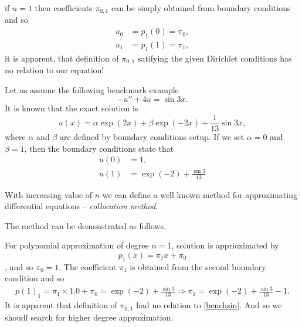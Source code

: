 if $n = 1$ then coefficients $\pi_{0,1}$ can be simply obtained from boundary conditions and so
\begin{equation}
 \begin{split}
  u_{0} &= p_{1}(0) = \pi_{0}, \\
   u_{1} &= p_{1}(1) = \pi_{1},
 \end{split} 
\end{equation}
it is apparent, that definition of $\pi_{0,1}$ satifying the given Dirichlet conditions has no relation to our equation!

Let us assume the following benchmark example
\begin{equation}
\label{benchsin}
 -u'' + 4u  = \sin 3x.
 \end{equation}
It is known that the exact solution is  
\begin{equation}
u(x) = \alpha \exp(2x) + \beta \exp(-2x)+ \frac{1}{13} \sin 3x,  
\end{equation}
where $\alpha$ and $\beta$ are defined by boundary conditions setup. If 
we set $\alpha = 0$ and $\beta = 1$, then the boundary conditions state 
that
\begin{equation}
\begin{split}
  u(0) &= 1, \\
  u(1) &= \exp(-2) + \frac{\sin 3}{13}
\end{split}
\end{equation}

With increasing value of $n$ we can define a well known method for approximating differential equations -- {\it collocation method}.

The method can be demonstrated as follows.

For polynomial approximation of degree $n=1$, solution is 
apprioximated by \begin{equation}p_{1}(x) = \pi_{1}x + \pi_{0}\end{equation}, and so $\pi_{0}=1$. 
The coefficient $\pi_{1}$ is obtained from the second boundary 
condition and so
\begin{equation}
\begin{split}
 p(1)_{1} = \pi_{1}\times 1.0 + \pi_{0} = \exp(-2) + \frac{\sin 3}{13} 
 \Rightarrow \pi_{1} = \exp(-2) + \frac{\sin 3}{13}  - 1.
 \end{split}
\end{equation}
It is apparent that definition of $\pi_{0,1}$ had no relation to 
\eqref{benchsin}. And so we shoudl search for higher degree 
approximation.

